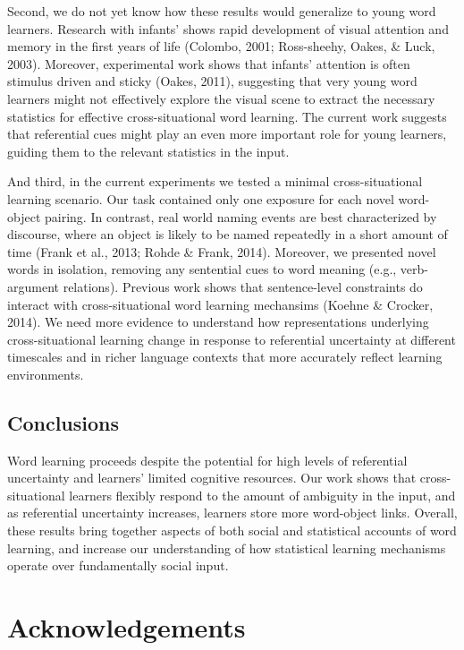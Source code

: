 \documentclass[authoryear, review]{elsarticle}
\begin{document}
Second, we do not yet know how these results would generalize to young
word learners. Research with infants' shows rapid development of visual
attention and memory in the first years of life (Colombo, 2001;
Ross-sheehy, Oakes, \& Luck, 2003). Moreover, experimental work shows
that infants' attention is often stimulus driven and sticky (Oakes,
2011), suggesting that very young word learners might not effectively
explore the visual scene to extract the necessary statistics for
effective cross-situational word learning. The current work suggests
that referential cues might play an even more important role for young
learners, guiding them to the relevant statistics in the input.

And third, in the current experiments we tested a minimal
cross-situational learning scenario. Our task contained only one
exposure for each novel word-object pairing. In contrast, real world
naming events are best characterized by discourse, where an object is
likely to be named repeatedly in a short amount of time (Frank et al.,
2013; Rohde \& Frank, 2014). Moreover, we presented novel words in
isolation, removing any sentential cues to word meaning (e.g.,
verb-argument relations). Previous work shows that sentence-level
constraints do interact with cross-situational word learning mechansims
(Koehne \& Crocker, 2014). We need more evidence to understand how
representations underlying cross-situational learning change in response
to referential uncertainty at different timescales and in richer
language contexts that more accurately reflect learning environments.

\subsection{Conclusions}\label{conclusions}

Word learning proceeds despite the potential for high levels of
referential uncertainty and learners' limited cognitive resources. Our
work shows that cross-situational learners flexibly respond to the
amount of ambiguity in the input, and as referential uncertainty
increases, learners store more word-object links. Overall, these results
bring together aspects of both social and statistical accounts of word
learning, and increase our understanding of how statistical learning
mechanisms operate over fundamentally social input.

\newpage

\section{Acknowledgements}\label{acknowledgements}
\end{document}
